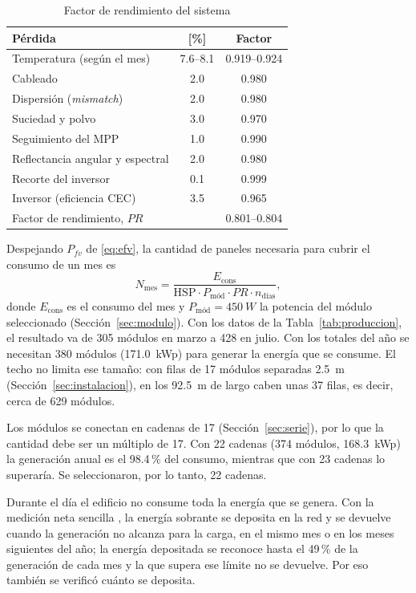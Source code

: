 \begin{table}[!htb]
\caption{Factor de rendimiento del sistema}
\label{tab:pr}
\centering
\footnotesize
\begin{tabular}{l c c}
\toprule
{Pérdida} & [\%] & Factor \\
\midrule
Temperatura (según el mes) & {7.6--8.1} & {0.919--0.924} \\
Cableado & 2.0 & 0.980 \\
Dispersión (\emph{mismatch}) & 2.0 & 0.980 \\
Suciedad y polvo & 3.0 & 0.970 \\
Seguimiento del MPP & 1.0 & 0.990 \\
Reflectancia angular y espectral & 2.0 & 0.980 \\
Recorte del inversor & 0.1 & 0.999 \\
Inversor (eficiencia CEC) & 3.5 & 0.965 \\
\midrule
\multicolumn{2}{l}{Factor de rendimiento, $PR$} & {0.801--0.804} \\
\bottomrule
\end{tabular}
\end{table}

Despejando $P_{fv}$ de \eqref{eq:efv}, la cantidad de paneles necesaria para cubrir el consumo de un mes es
\begin{equation}
N_{\text{mes}} = \frac{E_{\text{cons}}}{\mathrm{HSP}\cdot P_{\text{mód}}\cdot PR\cdot n_{\text{días}}},
\label{eq:nmes}
\end{equation}
donde $E_{\text{cons}}$ es el consumo del mes y $P_{\text{mód}}=\SI{450}{W}$ la potencia del módulo seleccionado (Sección~\ref{sec:modulo}). Con los datos de la Tabla~\ref{tab:produccion}, el resultado va de 305 módulos en marzo a 428 en julio. Con los totales del año se necesitan 380 módulos (\SI{171.0}{kWp}) para generar la energía que se consume. El techo no limita ese tamaño: con filas de 17 módulos separadas \SI{2.5}{m} (Sección~\ref{sec:instalacion}), en los \SI{92.5}{m} de largo caben unas 37 filas, es decir, cerca de 629 módulos.

Los módulos se conectan en cadenas de 17 (Sección~\ref{sec:serie}), por lo que la cantidad debe ser un múltiplo de 17. Con 22 cadenas (374 módulos, \SI{168.3}{kWp}) la generación anual es el 98.4\,\% del consumo, mientras que con 23 cadenas lo superaría. Se seleccionaron, por lo tanto, 22 cadenas.

Durante el día el edificio no consume toda la energía que se genera. Con la medición neta sencilla \cite{decreto43879}, la energía sobrante se deposita en la red y se devuelve cuando la generación no alcanza para la carga, en el mismo mes o en los meses siguientes del año; la energía depositada se reconoce hasta el 49\,\% de la generación de cada mes y la que supera ese límite no se devuelve. Por eso también se verificó cuánto se deposita.

